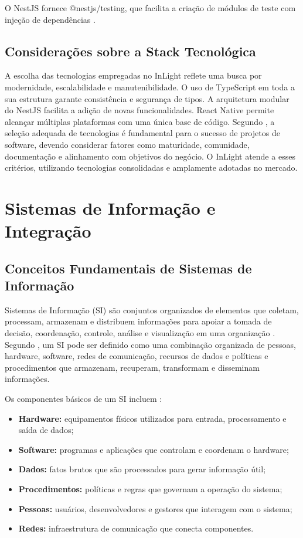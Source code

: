 O NestJS fornece @nestjs/testing, que facilita a criação de módulos de teste com injeção de dependências \cite{nestjs2023}.

\subsection{Considerações sobre a Stack Tecnológica}

A escolha das tecnologias empregadas no InLight reflete uma busca por modernidade, escalabilidade e manutenibilidade. O uso de TypeScript em toda a sua estrutura garante consistência e segurança de tipos. A arquitetura modular do NestJS facilita a adição de novas funcionalidades. React Native permite alcançar múltiplas plataformas com uma única base de código.
Segundo \cite{pressman2016}, a seleção adequada de tecnologias é fundamental para o sucesso de projetos de software, devendo considerar fatores como maturidade, comunidade, documentação e alinhamento com objetivos do negócio. O InLight atende a esses critérios, utilizando tecnologias consolidadas e amplamente adotadas no mercado.

\section{Sistemas de Informação e Integração}

\subsection{Conceitos Fundamentais de Sistemas de Informação}

Sistemas de Informação (SI) são conjuntos organizados de elementos que coletam, processam, armazenam e distribuem informações para apoiar a tomada de decisão, coordenação, controle, análise e visualização em uma organização \cite{laudon2020}. Segundo \cite{obrien2013}, um SI pode ser definido como uma combinação organizada de pessoas, hardware, software, redes de comunicação, recursos de dados e políticas e procedimentos que armazenam, recuperam, transformam e disseminam informações.

Os componentes básicos de um SI incluem \cite{stair2018}:

\begin{itemize}
    \item \textbf{Hardware:} equipamentos físicos utilizados para entrada, processamento e saída de dados;
    \item \textbf{Software:} programas e aplicações que controlam e coordenam o hardware;
    \item \textbf{Dados:} fatos brutos que são processados para gerar informação útil;
    \item \textbf{Procedimentos:} políticas e regras que governam a operação do sistema;
    \item \textbf{Pessoas:} usuários, desenvolvedores e gestores que interagem com o sistema;
    \item \textbf{Redes:} infraestrutura de comunicação que conecta componentes.
\end{itemize}

